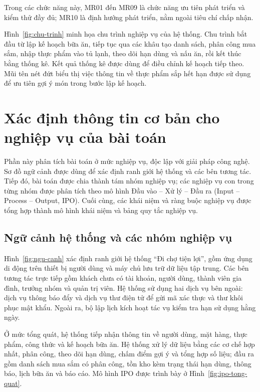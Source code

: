 Trong các chức năng này, MR01 đến MR09 là chức năng ưu tiên phát triển và kiểm thử đầy đủ; MR10 là định hướng phát triển, nằm ngoài tiêu chí chấp nhận.

Hình~\ref{fig:chu-trinh} minh họa chu trình nghiệp vụ của hệ thống. Chu trình bắt đầu từ lập kế hoạch bữa ăn, tiếp tục qua các khâu tạo danh sách, phân công mua sắm, nhập thực phẩm vào tủ lạnh, theo dõi hạn dùng và nấu ăn, rồi kết thúc bằng thống kê. Kết quả thống kê được dùng để điều chỉnh kế hoạch tiếp theo. Mũi tên nét đứt biểu thị việc thông tin về thực phẩm sắp hết hạn được sử dụng để ưu tiên gợi ý món trong bước lập kế hoạch.


\section{Xác định thông tin cơ bản cho nghiệp vụ của bài toán}\label{sec:thong-tin-nghiep-vu}

Phần này phân tích bài toán ở mức nghiệp vụ, độc lập với giải pháp công nghệ. Sơ đồ ngữ cảnh được dùng để xác định ranh giới hệ thống và các bên tương tác. Tiếp đó, bài toán được chia thành tám nhóm nghiệp vụ; các nghiệp vụ con trong từng nhóm được phân tích theo mô hình Đầu vào – Xử lý – Đầu ra (Input – Process – Output, IPO). Cuối cùng, các khái niệm và ràng buộc nghiệp vụ được tổng hợp thành mô hình khái niệm và bảng quy tắc nghiệp vụ.

\subsection{Ngữ cảnh hệ thống và các nhóm nghiệp vụ}\label{ssec:ngu-canh}

Hình~\ref{fig:ngu-canh} xác định ranh giới hệ thống “Đi chợ tiện lợi”, gồm ứng dụng di động trên thiết bị người dùng và máy chủ lưu trữ dữ liệu tập trung. Các bên tương tác trực tiếp gồm khách chưa có tài khoản, người dùng, thành viên gia đình, trưởng nhóm và quản trị viên. Hệ thống sử dụng hai dịch vụ bên ngoài: dịch vụ thông báo đẩy và dịch vụ thư điện tử để gửi mã xác thực và thư khôi phục mật khẩu. Ngoài ra, bộ lập lịch kích hoạt tác vụ kiểm tra hạn sử dụng hằng ngày.


Ở mức tổng quát, hệ thống tiếp nhận thông tin về người dùng, mặt hàng, thực phẩm, công thức và kế hoạch bữa ăn. Hệ thống xử lý dữ liệu bằng các cơ chế hợp nhất, phân công, theo dõi hạn dùng, chấm điểm gợi ý và tổng hợp số liệu; đầu ra gồm danh sách mua sắm có phân công, tồn kho kèm trạng thái hạn dùng, thông báo, lịch bữa ăn và báo cáo. Mô hình IPO được trình bày ở Hình~\ref{fig:ipo-tong-quat}.

